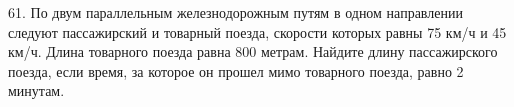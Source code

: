 61. По двум параллельным железнодорожным путям в одном направлении следуют пассажирский и товарный поезда, скорости которых равны 75 км/ч и 45 км/ч. Длина товарного поезда равна 800 метрам. Найдите длину пассажирского поезда, если время, за которое он прошел мимо товарного поезда, равно 2 минутам.\\
